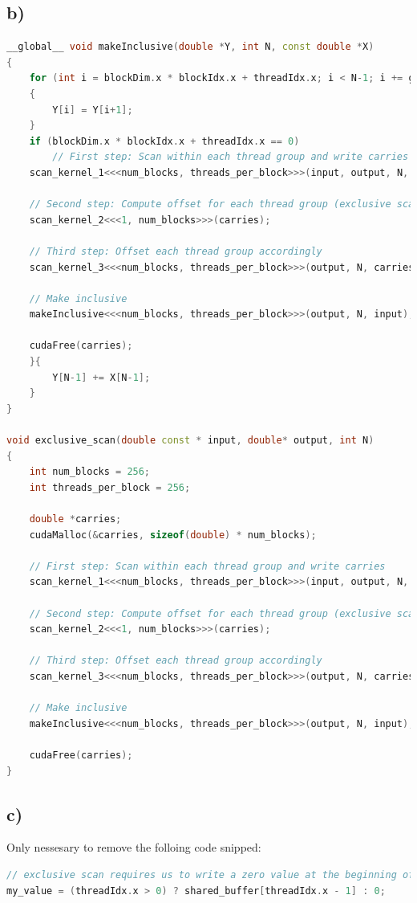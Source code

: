 \documentclass[11pt,a4paper]{article}
\begin{document}
\subsection*{b)}
\begin{lstlisting}[language=C++, caption={kernel for inclusive\_scan)}]
__global__ void makeInclusive(double *Y, int N, const double *X)
{
	for (int i = blockDim.x * blockIdx.x + threadIdx.x; i < N-1; i += gridDim.x * blockDim.x) 
	{
		Y[i] = Y[i+1];
	}
	if (blockDim.x * blockIdx.x + threadIdx.x == 0)
		// First step: Scan within each thread group and write carries
	scan_kernel_1<<<num_blocks, threads_per_block>>>(input, output, N, carries);
	
	// Second step: Compute offset for each thread group (exclusive scan for each thread group)
	scan_kernel_2<<<1, num_blocks>>>(carries);
	
	// Third step: Offset each thread group accordingly
	scan_kernel_3<<<num_blocks, threads_per_block>>>(output, N, carries);
	
	// Make inclusive
	makeInclusive<<<num_blocks, threads_per_block>>>(output, N, input);
	
	cudaFree(carries);
	}{
		Y[N-1] += X[N-1];
	}		
}

void exclusive_scan(double const * input, double* output, int N)
{
	int num_blocks = 256;
	int threads_per_block = 256;

	double *carries;
	cudaMalloc(&carries, sizeof(double) * num_blocks);

	// First step: Scan within each thread group and write carries
	scan_kernel_1<<<num_blocks, threads_per_block>>>(input, output, N, carries);
	
	// Second step: Compute offset for each thread group (exclusive scan for each thread group)
	scan_kernel_2<<<1, num_blocks>>>(carries);
	
	// Third step: Offset each thread group accordingly
	scan_kernel_3<<<num_blocks, threads_per_block>>>(output, N, carries);
	
	// Make inclusive
	makeInclusive<<<num_blocks, threads_per_block>>>(output, N, input);
	
	cudaFree(carries);
}
\end{lstlisting}
\subsection*{c)}
Only nessesary to remove the folloing code snipped:
\begin{lstlisting}[language=C++, caption={kernel for inclusive\_scan)}]
// exclusive scan requires us to write a zero value at the beginning of each block
my_value = (threadIdx.x > 0) ? shared_buffer[threadIdx.x - 1] : 0;
\end{lstlisting}
\end{document}
